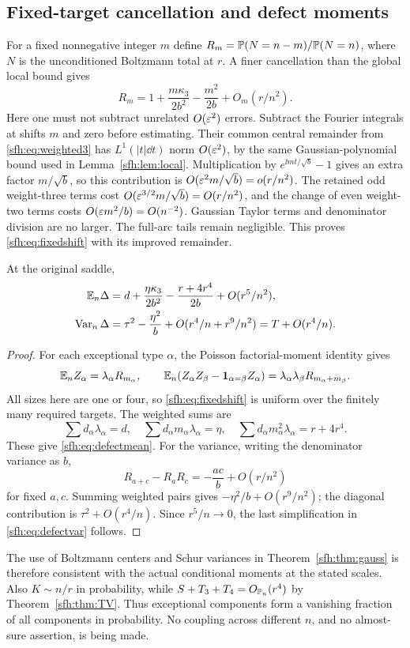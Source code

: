 \subsection{Fixed-target cancellation and defect moments}
For a fixed nonnegative integer $m$ define $R_m=\mathbb P(N=n-m)/\mathbb P(N=n)$, where $N$ is the unconditioned Boltzmann total at $r$. A finer cancellation than the global local bound gives
\begin{equation}\label{sfh:eq:fixedshift}
 R_m=1+\frac{m\kappa_3}{2b^2}-\frac{m^2}{2b}+O_m(r/n^2).
\end{equation}
Here one must not subtract unrelated $O(\varepsilon^2)$ errors. Subtract the Fourier integrals at shifts $m$ and zero before estimating. Their common central remainder from \eqref{sfh:eq:weighted3} has $L^1(|t|\dd t)$ norm $O(\varepsilon^2)$, by the same Gaussian-polynomial bound used in Lemma~\ref{sfh:lem:local}. Multiplication by $e^{\ii mt/\sqrt b}-1$ gives an extra factor $m/\sqrt b$, so this contribution is $O(\varepsilon^2m/\sqrt b)=o(r/n^2)$. The retained odd weight-three terms cost $O(\varepsilon^{3/2}m/\sqrt b)=O(r/n^2)$, and the change of even weight-two terms costs $O(\varepsilon m^2/b)=O(n^{-2})$. Gaussian Taylor terms and denominator division are no larger. The full-arc tails remain negligible. This proves \eqref{sfh:eq:fixedshift} with its improved remainder.

\begin{corollary}\label{sfh:cor:moments}
At the original saddle,
\begin{align}
 \mathbb E_n\Delta
 &=d+\frac{\eta\kappa_3}{2b^2}
       -\frac{r+4r^4}{2b}+O(r^5/n^2),\label{sfh:eq:defectmean}\\
 \operatorname{Var}_n\Delta
 &=\tau^2-\frac{\eta^2}{b}+O(r^4/n+r^9/n^2)
  =T+O(r^4/n).\label{sfh:eq:defectvar}
\end{align}
\end{corollary}
\begin{proof}
For each exceptional type $\alpha$, the Poisson factorial-moment identity gives
\[
 \mathbb E_n Z_\alpha=\lambda_\alpha R_{m_\alpha},\qquad
 \mathbb E_n(Z_\alpha Z_\beta-\mathbf1_{\alpha=\beta}Z_\alpha)
   =\lambda_\alpha\lambda_\beta R_{m_\alpha+m_\beta}.
\]
All sizes here are one or four, so \eqref{sfh:eq:fixedshift} is uniform over the finitely many required targets. The weighted sums are
\[
 \sum d_\alpha\lambda_\alpha=d,\quad
 \sum d_\alpha m_\alpha\lambda_\alpha=\eta,\quad
 \sum d_\alpha m_\alpha^2\lambda_\alpha=r+4r^4.
\]
These give \eqref{sfh:eq:defectmean}. For the variance, writing the denominator variance as $b$,
\[
 R_{a+c}-R_aR_c=-\frac{ac}{b}+O(r/n^2)
\]
for fixed $a,c$. Summing weighted pairs gives $-\eta^2/b+O(r^9/n^2)$; the diagonal contribution is $\tau^2+O(r^4/n)$. Since $r^5/n\to0$, the last simplification in \eqref{sfh:eq:defectvar} follows.
\end{proof}

The use of Boltzmann centers and Schur variances in Theorem~\ref{sfh:thm:gauss} is therefore consistent with the actual conditional moments at the stated scales. Also $K\sim n/r$ in probability, while $S+T_3+T_4=O_{\mathbb P_n}(r^4)$ by Theorem~\ref{sfh:thm:TV}. Thus exceptional components form a vanishing fraction of all components in probability. No coupling across different $n$, and no almost-sure assertion, is being made.
